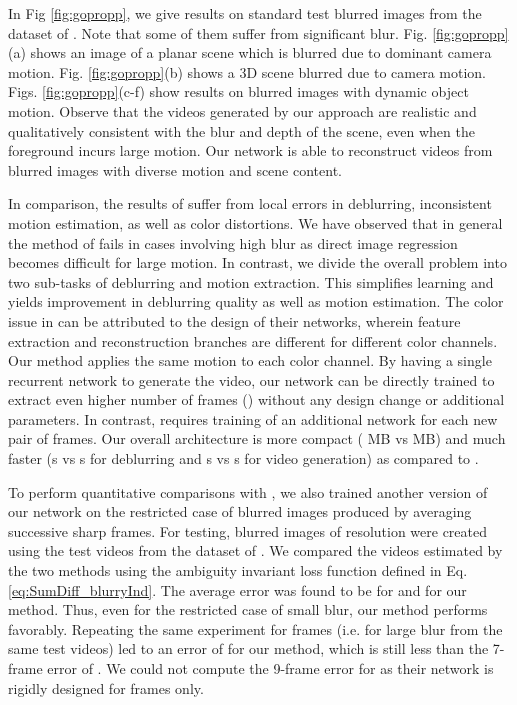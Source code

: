 \documentclass[10pt,twocolumn,letterpaper]{article}
\begin{document}
In Fig  \ref{fig:gopropp}, we give results on standard test blurred images from the dataset of \cite{nah2017deep}. Note that some of them suffer from significant blur. Fig. \ref{fig:gopropp}(a) shows an image of a planar scene which is blurred due to dominant camera motion. Fig. \ref{fig:gopropp}(b) shows a 3D scene blurred due to camera motion. Figs. \ref{fig:gopropp}(c-f) show results on blurred images with dynamic object motion. Observe that the videos generated by our approach are realistic and qualitatively consistent with the blur and depth of the scene, even when the foreground incurs large motion. Our network is able to reconstruct videos from blurred images with diverse motion and scene content.

In comparison, the results of \cite{jin2018learning} suffer from local errors in deblurring, inconsistent motion estimation, as well as color distortions. We have observed that in general the method of \cite{jin2018learning} fails in cases involving high blur as direct image regression becomes difficult for large motion. In contrast, we divide the overall problem into two sub-tasks of deblurring and motion extraction. This simplifies learning and yields improvement in deblurring quality as well as motion estimation. The color issue in \cite{jin2018learning} can be attributed to the design of their networks, wherein feature extraction and reconstruction branches are different for different color channels. Our method applies the same motion to each color channel. By having a single recurrent network to generate the video, our network can be directly trained to extract even higher number of frames () without any design change or additional parameters. In contrast, \cite{jin2018learning} requires training of an additional network for each new pair of frames. Our overall architecture is more compact ( MB vs  MB) and much faster (s vs s for deblurring and s vs s for video generation) as compared to \cite{jin2018learning}. 

To perform quantitative comparisons with \cite{jin2018learning}, we also trained another version of our network on the restricted case of blurred images produced by averaging  successive sharp frames. For testing,  blurred images of resolution  were created using the  test videos from the dataset of \cite{nah2017deep}. We compared the videos estimated by the two methods using the ambiguity invariant loss function defined in Eq. \ref{eq:SumDiff_blurryInd}. The average error was found to be  for \cite{jin2018learning} and  for our method. Thus, even for the restricted case of small blur, our method performs favorably. Repeating the same experiment for  frames (i.e. for large blur from the same test videos) led to an error of  for our method, which is still less than the 7-frame error of \cite{jin2018learning}. We could not compute the 9-frame error for \cite{jin2018learning} as their network is rigidly designed for  frames only.
\end{document}
